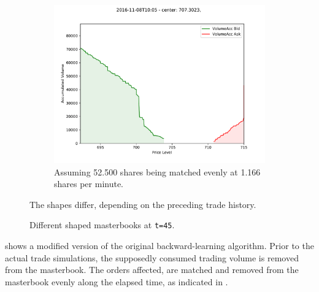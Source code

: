 \begin{figure}[ht]
\begin{subfigure}[t]{0.3\textwidth}
    	\end{subfigure}%
	\begin{subfigure}[t]{0.3\textwidth}
        		\centering
        		\includegraphics[width=\textwidth]{content/drawings/masterbook_customstart_SimEqual}
        		\caption{Assuming 52.500 shares being matched evenly at 1.166 shares per minute.}
		\label{fig:differingmasterbooks:SimEq}
    	\end{subfigure}%

	\caption{Different shaped masterbooks at \lstinline!t=45!.}
	The shapes differ, depending on the preceding trade history.
	\label{fig:differingmasterbooks}
\end{figure}

 shows a modified version of the original backward-learning algorithm. Prior to the actual trade simulations, the supposedly consumed trading volume is removed from the masterbook. The orders affected, are matched and removed from the masterbook evenly along the elapsed time, as indicated in .\\

